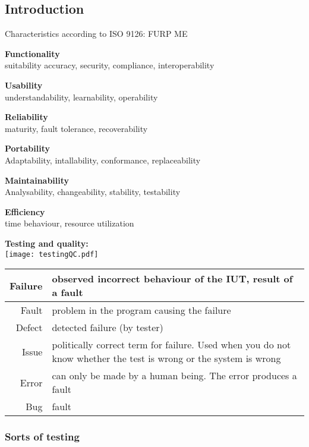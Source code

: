 \subsection{Introduction}
Characteristics according to ISO 9126: FURP ME
\begin{itemize*}
\item \textbf{Functionality}\\
 suitability accuracy, security, compliance, interoperability
\item \textbf{Usability}\\
 understandability, learnability, operability
\item \textbf{Reliability}\\
 maturity, fault tolerance, recoverability
\item \textbf{Portability}\\
 Adaptability, intallability, conformance, replaceability
\item \textbf{Maintainability}\\
 Analysability, changeability, stability, testability
\item \textbf{Efficiency}\\
 time behaviour, resource utilization
\end{itemize*}

\textbf{Testing and quality:}\\
\texttt{[image: testingQC.pdf]}

\begin{tabularx}{\linewidth}{r|X}
	Failure  & observed incorrect behaviour of the IUT, result of a fault \\ 
	\hline Fault  & problem in the program causing the failure \\ 
    \hline Defect & detected failure (by tester)\\ 
	\hline Issue & politically correct term for failure. Used when you do not know whether the test is wrong or the system is wrong \\ 
	\hline Error & can only be made by a human being. The error produces a fault\\
	\hline Bug & fault \\ 	
\end{tabularx} 

\subsubsection{Sorts of testing}

